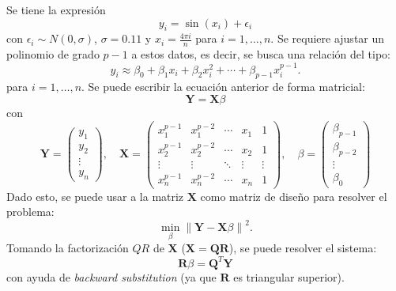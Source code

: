 Se tiene la expresión
\begin{equation} \label{eq:4}
	y_i = \sin{\left(x_i\right)} + \epsilon_i
\end{equation}
con $\epsilon_i \sim N(0, \sigma)$, $\sigma=0.11$ y $x_i=\frac{4 \pi i}{n}$ para $i=1, \ldots, n$. Se requiere ajustar un polinomio de grado $p-1$ a estos datos, es decir, se busca una relación del tipo:
\begin{equation} \label{eq:5}
	y_{i} \approx \beta_{0} + \beta_{1} x_i + \beta_{2} x_i^2 + \cdots + \beta_{p-1} x_i^{p-1}.
\end{equation}
para $i=1, \ldots, n$. Se puede escribir la ecuación anterior de forma matricial:
\begin{equation} \label{eq:6}
	\mathbf{Y} = \mathbf{X} \beta
\end{equation}
con
\begin{equation} \label{eq:7}
\mathbf{Y} = 
\begin{pmatrix}
	y_1 \\
	y_2 \\
	\vdots \\
	y_n
\end{pmatrix},\quad
\mathbf{X} = 
\begin{pmatrix}
	x_{1}^{p-1} & x_{1}^{p-2} & \cdots & x_{1} & 1 \\
	x_{2}^{p-1} & x_{2}^{p-2} & \cdots & x_{2} & 1 \\
	\vdots & \vdots & \ddots & \vdots & \vdots \\
	x_{n}^{p-1} & x_{n}^{p-2} & \cdots & x_{n} & 1
\end{pmatrix},\quad
\beta = 
\begin{pmatrix}
	\beta_{p-1} \\
	\beta_{p-2} \\
	\vdots \\
	\beta_{0}
\end{pmatrix}
\end{equation} 
Dado esto, se puede usar a la matriz $\mathbf{X}$ como matriz de diseño para resolver el problema:
\begin{equation} \label{eq:8}
	\min_{\beta} \left\| \mathbf{Y} - \mathbf{X}\beta \right\|^2.
\end{equation}
Tomando la factorización $QR$ de $\mathbf{X}$ ($\mathbf{X} = \mathbf{QR}$), se puede resolver el sistema:
\begin{equation} \label{eq:9}
	\mathbf{R}\beta = \mathbf{Q}^{T}\mathbf{Y}
\end{equation}
con ayuda de {\it backward substitution} (ya que $\mathbf{R}$ es triangular superior).

